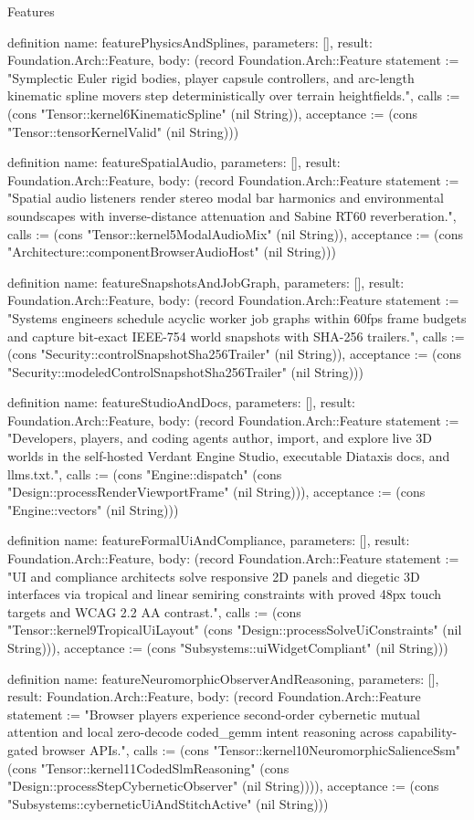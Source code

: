\begin{lexlean}{Features}
\begin{semanticmodule}
definition{
  name: featurePhysicsAndSplines,
  parameters: [],
  result: Foundation.Arch::Feature,
  body: (record Foundation.Arch::Feature {statement := "Symplectic Euler rigid bodies, player capsule controllers, and arc-length kinematic spline movers step deterministically over terrain heightfields.", calls := (cons "Tensor::kernel6KinematicSpline" (nil String)), acceptance := (cons "Tensor::tensorKernelValid" (nil String))})
}

definition{
  name: featureSpatialAudio,
  parameters: [],
  result: Foundation.Arch::Feature,
  body: (record Foundation.Arch::Feature {statement := "Spatial audio listeners render stereo modal bar harmonics and environmental soundscapes with inverse-distance attenuation and Sabine RT60 reverberation.", calls := (cons "Tensor::kernel5ModalAudioMix" (nil String)), acceptance := (cons "Architecture::componentBrowserAudioHost" (nil String))})
}

definition{
  name: featureSnapshotsAndJobGraph,
  parameters: [],
  result: Foundation.Arch::Feature,
  body: (record Foundation.Arch::Feature {statement := "Systems engineers schedule acyclic worker job graphs within 60fps frame budgets and capture bit-exact IEEE-754 world snapshots with SHA-256 trailers.", calls := (cons "Security::controlSnapshotSha256Trailer" (nil String)), acceptance := (cons "Security::modeledControlSnapshotSha256Trailer" (nil String))})
}

definition{
  name: featureStudioAndDocs,
  parameters: [],
  result: Foundation.Arch::Feature,
  body: (record Foundation.Arch::Feature {statement := "Developers, players, and coding agents author, import, and explore live 3D worlds in the self-hosted Verdant Engine Studio, executable Diataxis docs, and llms.txt.", calls := (cons "Engine::dispatch" (cons "Design::processRenderViewportFrame" (nil String))), acceptance := (cons "Engine::vectors" (nil String))})
}

definition{
  name: featureFormalUiAndCompliance,
  parameters: [],
  result: Foundation.Arch::Feature,
  body: (record Foundation.Arch::Feature {statement := "UI and compliance architects solve responsive 2D panels and diegetic 3D interfaces via tropical and linear semiring constraints with proved 48px touch targets and WCAG 2.2 AA contrast.", calls := (cons "Tensor::kernel9TropicalUiLayout" (cons "Design::processSolveUiConstraints" (nil String))), acceptance := (cons "Subsystems::uiWidgetCompliant" (nil String))})
}

definition{
  name: featureNeuromorphicObserverAndReasoning,
  parameters: [],
  result: Foundation.Arch::Feature,
  body: (record Foundation.Arch::Feature {statement := "Browser players experience second-order cybernetic mutual attention and local zero-decode coded_gemm intent reasoning across capability-gated browser APIs.", calls := (cons "Tensor::kernel10NeuromorphicSalienceSsm" (cons "Tensor::kernel11CodedSlmReasoning" (cons "Design::processStepCyberneticObserver" (nil String)))), acceptance := (cons "Subsystems::cyberneticUiAndStitchActive" (nil String))})
}


\end{semanticmodule}
\end{lexlean}
